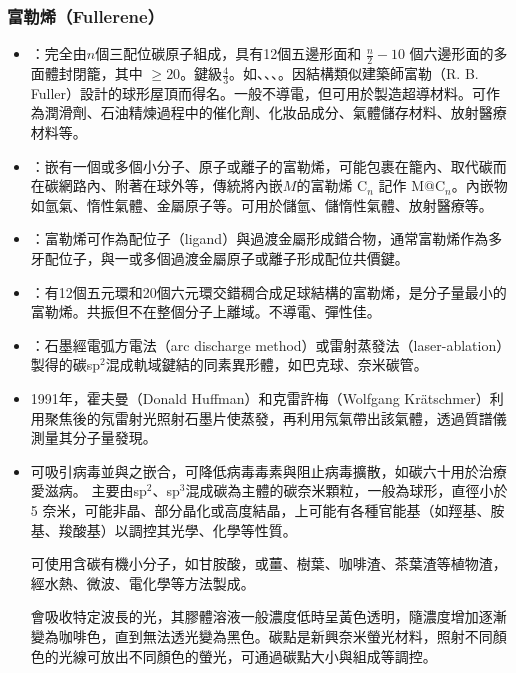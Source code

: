 \documentclass[a4paper,12pt]{report}
\begin{document}
\begin{itemize}
\subsubsection{富勒烯（Fullerene）}
\begin{itemize}
\item {}：完全由$n$個三配位碳原子組成，具有12個五邊形面和 $\frac{n}{2}-10$ 個六邊形面的多面體封閉籠，其中 $\geq 20$。鍵級$\frac{4}{3}$。如、、、。因結構類似建築師富勒（R. B. Fuller）設計的球形屋頂而得名。一般不導電，但可用於製造超導材料。可作為潤滑劑、石油精煉過程中的催化劑、化妝品成分、氣體儲存材料、放射醫療材料等。
\item {}：嵌有一個或多個小分子、原子或離子的富勒烯，可能包裹在籠內、取代碳而在碳網路內、附著在球外等，傳統將內嵌$M$的富勒烯 C$_n$ 記作 M@C$_n$。內嵌物如氫氣、惰性氣體、金屬原子等。可用於儲氫、儲惰性氣體、放射醫療等。
\item {}：富勒烯可作為配位子（ligand）與過渡金屬形成錯合物，通常富勒烯作為多牙配位子，與一或多個過渡金屬原子或離子形成配位共價鍵。
\item {}：有12個五元環和20個六元環交錯稠合成足球結構的富勒烯，是分子量最小的富勒烯。共振但不在整個分子上離域。不導電、彈性佳。
\item {}：石墨經電弧方電法（arc discharge method）或雷射蒸發法（laser-ablation）製得的碳sp$^2$混成軌域鍵結的同素異形體，如巴克球、奈米碳管。
\item 1991年，霍夫曼（Donald Huffman）和克雷許梅（Wolfgang Krätschmer）利用聚焦後的氖雷射光照射石墨片使蒸發，再利用氖氣帶出該氣體，透過質譜儀測量其分子量發現。
\item 可吸引病毒並與之嵌合，可降低病毒毒素與阻止病毒擴散，如碳六十用於治療愛滋病。
\eit
{}
主要由sp$^2$、sp$^3$混成碳為主體的碳奈米顆粒，一般為球形，直徑小於 5 奈米，可能非晶、部分晶化或高度結晶，上可能有各種官能基（如羥基、胺基、羧酸基）以調控其光學、化學等性質。

可使用含碳有機小分子，如甘胺酸，或薑、樹葉、咖啡渣、茶葉渣等植物渣，經水熱、微波、電化學等方法製成。

會吸收特定波長的光，其膠體溶液一般濃度低時呈黃色透明，隨濃度增加逐漸變為咖啡色，直到無法透光變為黑色。碳點是新興奈米螢光材料，照射不同顏色的光線可放出不同顏色的螢光，可通過碳點大小與組成等調控。


\end{itemize}
\end{itemize}
\end{document}
